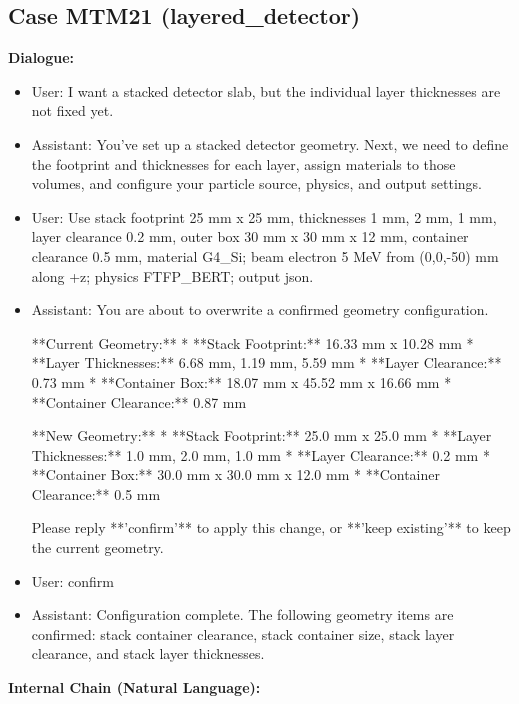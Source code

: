 \documentclass[11pt]{ctexart}
\begin{document}
\subsection{Case MTM21 (layered\_detector)}
\textbf{Dialogue:}
\begin{itemize}
\item User: I want a stacked detector slab, but the individual layer thicknesses are not fixed yet.
\item Assistant: You've set up a stacked detector geometry. Next, we need to define the footprint and thicknesses for each layer, assign materials to those volumes, and configure your particle source, physics, and output settings.
\item User: Use stack footprint 25 mm x 25 mm, thicknesses 1 mm, 2 mm, 1 mm, layer clearance 0.2 mm, outer box 30 mm x 30 mm x 12 mm, container clearance 0.5 mm, material G4\_Si; beam electron 5 MeV from (0,0,-50) mm along +z; physics FTFP\_BERT; output json.
\item Assistant: You are about to overwrite a confirmed geometry configuration.

**Current Geometry:**
*   **Stack Footprint:** 16.33 mm x 10.28 mm
*   **Layer Thicknesses:** 6.68 mm, 1.19 mm, 5.59 mm
*   **Layer Clearance:** 0.73 mm
*   **Container Box:** 18.07 mm x 45.52 mm x 16.66 mm
*   **Container Clearance:** 0.87 mm

**New Geometry:**
*   **Stack Footprint:** 25.0 mm x 25.0 mm
*   **Layer Thicknesses:** 1.0 mm, 2.0 mm, 1.0 mm
*   **Layer Clearance:** 0.2 mm
*   **Container Box:** 30.0 mm x 30.0 mm x 12.0 mm
*   **Container Clearance:** 0.5 mm

Please reply **'confirm'** to apply this change, or **'keep existing'** to keep the current geometry.
\item User: confirm
\item Assistant: Configuration complete. The following geometry items are confirmed: stack container clearance, stack container size, stack layer clearance, and stack layer thicknesses.
\end{itemize}
\textbf{Internal Chain (Natural Language):}
\end{document}
